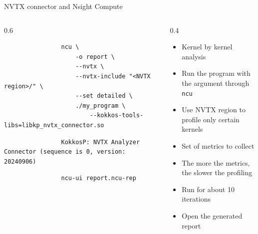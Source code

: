 \documentclass[
    aspectratio=169,
    \createHandout
]{beamer}
\begin{document}
\begin{frame}[fragile]{NVTX connector and Nsight Compute}
    \begin{columns}
        \begin{column}{0.6\linewidth}
            \begin{verbatim}
                ncu \
                    -o report \
                    --nvtx \
                    --nvtx-include "<NVTX region>/" \
                    --set detailed \
                    ./my_program \
                        --kokkos-tools-libs=libkp_nvtx_connector.so
            \end{verbatim}

            \begin{verbatim}
                KokkosP: NVTX Analyzer Connector (sequence is 0, version: 20240906)
            \end{verbatim}

            \begin{verbatim}
                ncu-ui report.ncu-rep
            \end{verbatim}
        \end{column}
        \begin{column}{0.4\linewidth}
            \begin{itemize}
                \item Kernel by kernel analysis
                \item Run the program with the argument through \texttt{ncu}
                \item Use NVTX region to profile only certain kernels
                \item Set of metrics to collect
                \item The more the metrics, the slower the profiling
                \item Run for about 10 iterations
                \item Open the generated report
            \end{itemize}
        \end{column}
    \end{columns}
\end{frame}
\end{document}
